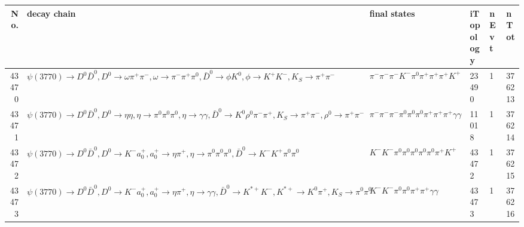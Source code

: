 \begin{table}[htbp] 
\begin{center}
\begin{small}
\begin{tabular}{rlllll}\hline\hline
 No. & decay chain & final states &  iTopology & nEvt & nTot \\\hline
43470&$\psi(3770) \rightarrow D^{0} \bar{D}^{0} , D^{0}  \rightarrow \omega         \pi^{+}        \pi^{-}        , \omega          \rightarrow \pi^{-}        \pi^{+}        \pi^{0}        , \bar{D}^{0}  \rightarrow \phi           K^{0}          , \phi            \rightarrow K^{+}          K^{-}          , K_{S}           \rightarrow \pi^{+}        \pi^{-}        $&$\pi^{-}        \pi^{-}        \pi^{-}        K^{-}          \pi^{0}        \pi^{+}        \pi^{+}        \pi^{+}        K^{+}          $&23490&    1&376213\\
43471&$\psi(3770) \rightarrow D^{0} \bar{D}^{0} , D^{0}  \rightarrow \eta          \eta          , \eta           \rightarrow \pi^{0}        \pi^{0}        \pi^{0}        , \eta           \rightarrow \gamma       \gamma       , \bar{D}^{0}  \rightarrow K^{0}          \rho^{0}      \pi^{-}        \pi^{+}        , K_{S}           \rightarrow \pi^{+}        \pi^{-}        , \rho^{0}       \rightarrow \pi^{+}        \pi^{-}        $&$\pi^{-}        \pi^{-}        \pi^{-}        \pi^{0}        \pi^{0}        \pi^{0}        \pi^{+}        \pi^{+}        \pi^{+}        \gamma       \gamma       $&11018&    1&376214\\
43472&$\psi(3770) \rightarrow D^{0} \bar{D}^{0} , D^{0}  \rightarrow K^{-}          a_{0}^{+}      , a_{0}^{+}       \rightarrow \eta          \pi^{+}        , \eta           \rightarrow \pi^{0}        \pi^{0}        \pi^{0}        , \bar{D}^{0}  \rightarrow K^{-}          K^{+}          \pi^{0}        \pi^{0}        $&$K^{-}          K^{-}          \pi^{0}        \pi^{0}        \pi^{0}        \pi^{0}        \pi^{0}        \pi^{+}        K^{+}          $&43472&    1&376215\\
43473&$\psi(3770) \rightarrow D^{0} \bar{D}^{0} , D^{0}  \rightarrow K^{-}          a_{0}^{+}      , a_{0}^{+}       \rightarrow \eta          \pi^{+}        , \eta           \rightarrow \gamma       \gamma       , \bar{D}^{0}  \rightarrow K^{*+}         K^{-}          , K^{*+}          \rightarrow K^{0}          \pi^{+}        , K_{S}           \rightarrow \pi^{0}        \pi^{0}        $&$K^{-}          K^{-}          \pi^{0}        \pi^{0}        \pi^{+}        \pi^{+}        \gamma       \gamma       $&43473&    1&376216\\

\end{tabular}
\end{small}
\end{center}
\end{table}
